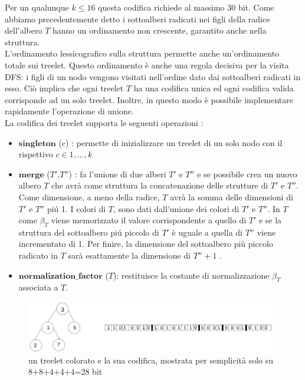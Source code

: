 Per un qualunque $ k \le 16 $ questa codifica richiede al massimo 30 bit.
Come abbiamo precedentemente detto i sottoalberi radicati nei figli della radice dell'albero $ T $ hanno un ordinamento non crescente, garantito anche nella struttura.\\
L'ordinamento lessicografico sulla struttura permette anche un'ordinamento totale sui treelet. Questo ordinamento \`e anche una regola decisiva per la visita DFS: i figli di un nodo vengono visitati nell'ordine dato dai sottoalberi radicati in esso.
Ci\`o implica che ogni treelet $ T $ ha una codifica unica ed ogni codifica valida corrisponde ad un solo treelet. Inoltre, in questo modo \`e possibile implementare rapidamente l'operazione di unione.\\

La codifica dei treelet supporta le seguenti operazioni :
\begin{itemize}
	\item $ \textbf{singleton} $ (c) : permette di inizializzare un treelet di un solo nodo con il rispettivo $ c \in {1, \dots, k} $
	\item $ \textbf{merge} $ ($ T' $,$ T'' $) : fa l'unione di due alberi $ T' $ e $ T'' $ e se possibile crea un nuovo albero $ T $ che avr\`a come struttura la concatenazione delle strutture di $ T' $ e $ T'' $.
	Come dimensione, a meno della radice, $ T $ avr\`a la somma delle dimensioni di $ T' $ e $ T'' $ pi\'u 1.
	I colori di $ T $, sono dati dall'unione dei colori di $ T' $ e $ T'' $.
	In $ T $ come $ \beta_T $ viene memorizzato il valore corrispondente a quello di $ T' $ e se la struttura del sottoalbero pi\'u piccolo di $ T' $ \`e uguale a quella di $ T'' $ viene incrementato di 1. Per finire, la dimensione del sottoalbero pi\`u piccolo radicato in $ T $ sar\`a esattamente la dimensione di $ T''+1  $ .
	\item $\textbf{normalization\_factor}$ ($ T $): restituisce la costante di normalizzazione $ \beta_T $ associata a $ T $.
	    
\end{itemize}
\begin{figure}[htbp]
	\centering
	\includegraphics[width=11cm]{capitolo2/grafo4}
	\caption{un treelet colorato e la sua codifica, mostrata per semplicit\`a solo su 8+8+4+4+4=28 bit}
	\label{figura1}
\end{figure}
